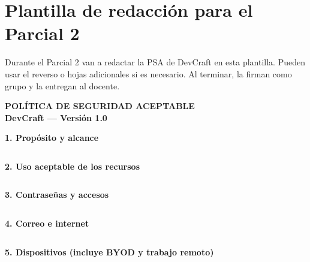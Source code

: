 \documentclass[12pt,a4paper]{article}
\renewcommand{\arraystretch}{1.25}
\begin{document}
\newpage
\section{Plantilla de redacci\'on para el Parcial 2}

\begin{cajaParcial}[title={Instrucciones}]
Durante el Parcial 2 van a redactar la PSA de DevCraft en esta plantilla. Pueden usar el reverso o hojas adicionales si es necesario. Al terminar, la firman como grupo y la entregan al docente.
\end{cajaParcial}

\vspace{6pt}

\begin{center}
\Large\bfseries\color{azulGobierno}
POL\'ITICA DE SEGURIDAD ACEPTABLE\\[4pt]
\normalsize DevCraft --- Versi\'on 1.0
\end{center}

\vspace{8pt}
\renewcommand{\arraystretch}{1.6}

\noindent\textbf{1. Prop\'osito y alcance}
\begin{tabularx}{\textwidth}{|X|}
\hline
\\[2cm]
\hline
\end{tabularx}

\vspace{6pt}
\noindent\textbf{2. Uso aceptable de los recursos}
\begin{tabularx}{\textwidth}{|X|}
\hline
\\[2cm]
\hline
\end{tabularx}

\vspace{6pt}
\noindent\textbf{3. Contrase\~nas y accesos}
\begin{tabularx}{\textwidth}{|X|}
\hline
\\[2cm]
\hline
\end{tabularx}

\newpage
\noindent\textbf{4. Correo e internet}
\begin{tabularx}{\textwidth}{|X|}
\hline
\\[2cm]
\hline
\end{tabularx}

\vspace{6pt}
\noindent\textbf{5. Dispositivos (incluye BYOD y trabajo remoto)}
\begin{tabularx}{\textwidth}{|X|}
\hline
\\[2.5cm]
\hline
\end{tabularx}
\end{document}
